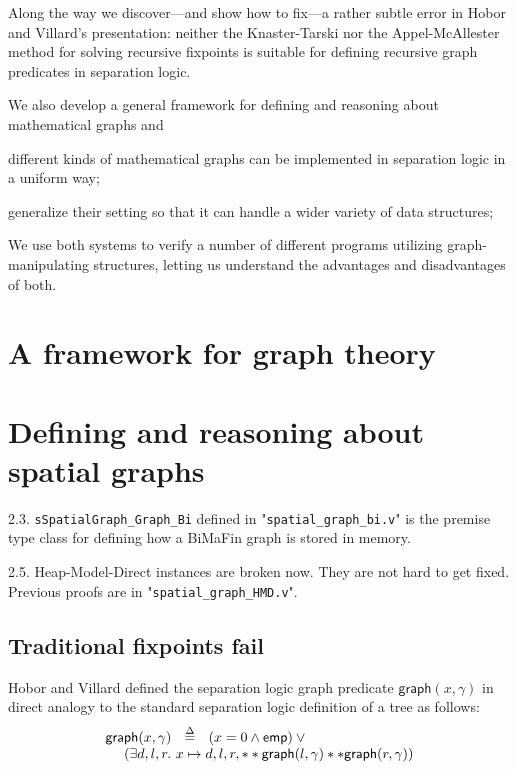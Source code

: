 \documentclass[pldi]{sigplanconf-pldi15}
\begin{document}
Along the way we discover---and show how to fix---a rather subtle error in Hobor and Villard's presentation: neither the
Knaster-Tarski \cite{tarski:fixpoint} nor the Appel-McAllester \cite{appel:fixpoint} method for solving recursive fixpoints is suitable for defining
recursive graph predicates in separation logic.

  We also develop a general framework for defining and reasoning about mathematical
graphs and

different kinds of mathematical
graphs can be implemented in separation logic in a uniform way;

generalize their setting
so that it can handle a wider variety of data structures;

We use both systems to verify a number of different programs utilizing graph-manipulating structures,
letting us understand the advantages and disadvantages of both.

\section{A framework for graph theory}


\section{Defining and reasoning about spatial graphs}

2.3. \texttt{sSpatialGraph\_Graph\_Bi} defined in "\texttt{spatial\_graph\_bi.v}" is the premise type class for defining how a BiMaFin graph is stored in memory.

2.5. Heap-Model-Direct instances are broken now. They are not hard to get fixed. Previous proofs are in "\texttt{spatial\_graph\_HMD.v}".

\subsection{Traditional fixpoints fail}

Hobor and Villard defined the separation logic graph predicate $\mathsf{graph}(x,\gamma)$ in direct analogy to the standard
separation logic definition of a tree as follows:
\[
\begin{array}{l}
\mathsf{graph}(x,\gamma) ~~ \stackrel{\Delta}{=} ~~ ({x = 0} \wedge \mathsf{emp}) \vee \null \\
~~~~ (\exists d,l,r.~ x \mapsto d,l,r, ** \mathsf{graph}(l,\gamma) ** \mathsf{graph}(r,\gamma))
\end{array}
\]
\end{document}
